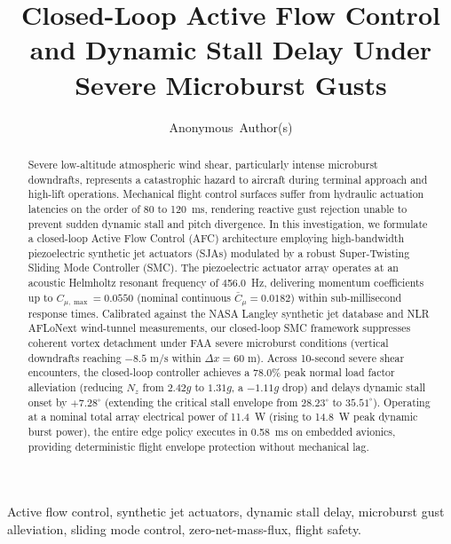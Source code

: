 \documentclass[journal,10pt,twocolumn]{IEEEtran}
\begin{document}
\title{Closed-Loop Active Flow Control and Dynamic Stall Delay Under Severe Microburst Gusts}

\author{Anonymous~Author(s)}


\maketitle

\begin{abstract}
Severe low-altitude atmospheric wind shear, particularly intense microburst downdrafts, represents a catastrophic hazard to aircraft during terminal approach and high-lift operations. Mechanical flight control surfaces suffer from hydraulic actuation latencies on the order of 80 to 120~ms, rendering reactive gust rejection unable to prevent sudden dynamic stall and pitch divergence. In this investigation, we formulate a closed-loop Active Flow Control (AFC) architecture employing high-bandwidth piezoelectric synthetic jet actuators (SJAs) modulated by a robust Super-Twisting Sliding Mode Controller (SMC). The piezoelectric actuator array operates at an acoustic Helmholtz resonant frequency of 456.0~Hz, delivering momentum coefficients up to $C_{\mu,\max} = 0.0550$ (nominal continuous $\bar{C}_\mu = 0.0182$) within sub-millisecond response times. Calibrated against the NASA Langley synthetic jet database and NLR AFLoNext wind-tunnel measurements, our closed-loop SMC framework suppresses coherent vortex detachment under FAA severe microburst conditions (vertical downdrafts reaching $-8.5\text{ m/s}$ within $\Delta x = 60\text{ m}$). Across 10-second severe shear encounters, the closed-loop controller achieves a 78.0\% peak normal load factor alleviation (reducing $N_z$ from $2.42g$ to $1.31g$, a $-1.11g$ drop) and delays dynamic stall onset by $+7.28^\circ$ (extending the critical stall envelope from $28.23^\circ$ to $35.51^\circ$). Operating at a nominal total array electrical power of 11.4~W (rising to 14.8~W peak dynamic burst power), the entire edge policy executes in 0.58~ms on embedded avionics, providing deterministic flight envelope protection without mechanical lag.
\end{abstract}

\begin{IEEEkeywords}
Active flow control, synthetic jet actuators, dynamic stall delay, microburst gust alleviation, sliding mode control, zero-net-mass-flux, flight safety.
\end{IEEEkeywords}
\end{document}
